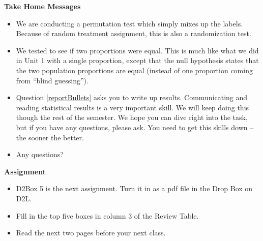 \begin{center}
  {\bf Take Home Messages}
\end{center}
  \begin{itemize}
  \item We are conducting a permutation test which simply mixes up the
    labels.  Because of random treatment assignment, this is also a
    randomization test. 
  \item We tested to see if  two proportions were
    equal. This is much like what we did in Unit 1 with a single
    proportion, except that the null hypothesis states that the two
    population proportions are equal (instead of one proportion coming
    from ``blind guessing'').
  \item Question \ref{reportBullets} asks you to write up results.
    Communicating 
    and reading statistical results is a very important skill.  We
    will keep doing this though the rest of the semester.  We hope you
    can dive right into the task, but if you have any questions,
    please ask.  You need to get this skills down -- the sooner the
    better. 
 \item 
 Any questions?\vfill
  \end{itemize}





\noindent
{\bf Assignment} \vspace{-.2in}
\begin{itemize}
\item D2Box 5 is the next assignment.
    Turn it in as a pdf file in the Drop Box on D2L.
  \item Fill in the top five boxes in column 3 of the Review Table.
  \item Read the next two pages before your next class.
\end{itemize}


